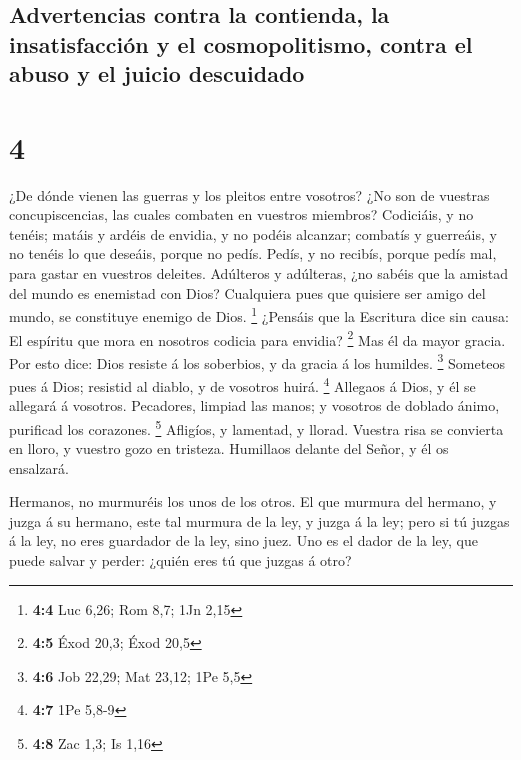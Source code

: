 \hypertarget{advertencias-contra-la-contienda-la-insatisfacciuxf3n-y-el-cosmopolitismo-contra-el-abuso-y-el-juicio-descuidado}{%
\subsection{Advertencias contra la contienda, la insatisfacción y el
cosmopolitismo, contra el abuso y el juicio
descuidado}\label{advertencias-contra-la-contienda-la-insatisfacciuxf3n-y-el-cosmopolitismo-contra-el-abuso-y-el-juicio-descuidado}}

\hypertarget{section-3}{%
\section{4}\label{section-3}}

 ¿De dónde vienen las guerras y los pleitos entre
vosotros? ¿No son de vuestras concupiscencias, las cuales combaten en
vuestros miembros?  Codiciáis, y no tenéis; matáis y
ardéis de envidia, y no podéis alcanzar; combatís y guerreáis, y no
tenéis lo que deseáis, porque no pedís.  Pedís, y no
recibís, porque pedís mal, para gastar en vuestros deleites.
 Adúlteros y adúlteras, ¿no sabéis que la amistad del
mundo es enemistad con Dios? Cualquiera pues que quisiere ser amigo del
mundo, se constituye enemigo de Dios. \footnote{\textbf{4:4} Luc 6,26;
  Rom 8,7; 1Jn 2,15}  ¿Pensáis que la Escritura dice sin
causa: El espíritu que mora en nosotros codicia para envidia?
\footnote{\textbf{4:5} Éxod 20,3; Éxod 20,5}  Mas él da
mayor gracia. Por esto dice: Dios resiste á los soberbios, y da gracia á
los humildes. \footnote{\textbf{4:6} Job 22,29; Mat 23,12; 1Pe 5,5}
 Someteos pues á Dios; resistid al diablo, y de vosotros
huirá. \footnote{\textbf{4:7} 1Pe 5,8-9}  Allegaos á Dios,
y él se allegará á vosotros. Pecadores, limpiad las manos; y vosotros de
doblado ánimo, purificad los corazones. \footnote{\textbf{4:8} Zac 1,3;
  Is 1,16}  Afligíos, y lamentad, y llorad. Vuestra risa
se convierta en lloro, y vuestro gozo en tristeza. 
Humillaos delante del Señor, y él os ensalzará.

 Hermanos, no murmuréis los unos de los otros. El que
murmura del hermano, y juzga á su hermano, este tal murmura de la ley, y
juzga á la ley; pero si tú juzgas á la ley, no eres guardador de la ley,
sino juez.  Uno es el dador de la ley, que puede salvar y
perder: ¿quién eres tú que juzgas á otro?

